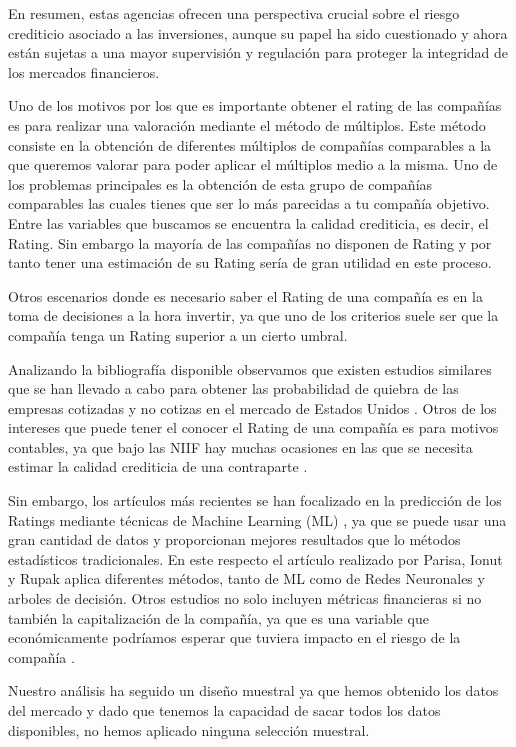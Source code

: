 \documentclass{article}
\begin{document}
En resumen, estas agencias ofrecen una perspectiva crucial sobre el riesgo crediticio asociado a las inversiones, aunque su papel ha sido cuestionado y ahora están sujetas a una mayor supervisión y regulación para proteger la integridad de los mercados financieros.

Uno de los motivos por los que es importante obtener el rating de las compañías es para realizar una valoración mediante el método de múltiplos. Este método consiste en la obtención de diferentes múltiplos de compañías comparables a la que queremos valorar para poder aplicar el múltiplos medio a la misma. Uno de los problemas principales es la obtención de esta grupo de compañías comparables las cuales tienes que ser lo más parecidas a tu compañía objetivo. Entre las variables que buscamos se encuentra la calidad crediticia, es decir, el Rating. Sin embargo la mayoría de las compañías no disponen de Rating y por tanto tener una estimación de su Rating sería de gran utilidad en este proceso.

Otros escenarios donde es necesario saber el Rating de una compañía es en la toma de decisiones a la hora invertir, ya que uno de los criterios suele ser que la compañía tenga un Rating superior a un cierto umbral. 

Analizando la bibliografía disponible observamos que existen estudios similares que se han llevado a cabo para obtener las probabilidad de quiebra de las empresas cotizadas y no cotizas en el mercado de Estados Unidos \cite{prob_default}. Otros de los intereses que puede tener el conocer el Rating de una compañía es para motivos contables, ya que bajo las NIIF hay muchas ocasiones en las que se necesita estimar la calidad crediticia de una contraparte \cite{rating_for_accounting}. 

Sin embargo, los artículos más recientes se han focalizado en la predicción de los Ratings mediante técnicas de Machine Learning (ML) \cite{rating_ML_general}, ya que se puede usar una gran cantidad de datos y proporcionan mejores resultados que lo métodos estadísticos tradicionales. En este respecto el artículo realizado por Parisa, Ionut y Rupak \cite{RNN_rating} aplica diferentes métodos, tanto de ML como de Redes Neuronales y arboles de decisión. Otros estudios no solo incluyen métricas financieras si no también la capitalización de la compañía, ya que es una variable que económicamente podríamos esperar que tuviera impacto en el riesgo de la compañía \cite{rating_market_cap}.

Nuestro análisis ha seguido un diseño muestral ya que hemos obtenido los datos del mercado y dado que tenemos la capacidad de sacar todos los datos disponibles, no hemos aplicado ninguna selección muestral.
\end{document}
